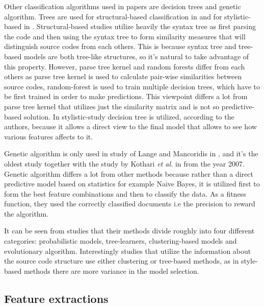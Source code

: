 \documentclass[english]{tktltiki2}
\theoremstyle{definition}
\theoremstyle{remark}
\begin{document}
Other classification algorithms used in papers are decision trees and genetic algorithm. Trees are used for structural-based classification in \cite{Son:2013:APS:2508269.2508323, caliskan2015anonymizing} and for stylistic-based in \cite{Elenbogen:2008:DOS:1295109.1295123}. Structural-based studies utilize heavily the syntax tree as first parsing the code and then using the syntax tree to form similarity measures that will distinguish source codes from each others. This is because syntax tree and tree-based models are both tree-like structures, so it's natural to take advantage of this property. However, parse tree kernel and random forests differ from each others as parse tree kernel is used to calculate pair-wise similarities between source codes, random-forest is used to train multiple decision trees, which have to be first trained in order to make predictions. This viewpoint differs a lot from parse tree kernel that utilizes just the similarity matrix and is not so predictive-based solution. In stylistic-study decision tree is utilized, according to the authors, because it allows a direct view to the final model that allows to see how various features affects to it. 

Genetic algorithm is only used in study of Lange and Mancoridis in \cite{lange2007using}, and it's the oldest study together with the study by Kothari \textit{et al.} in \cite{kothari2007probabilistic} from the year 2007. Genetic algorithm differs a lot from other methods because rather than a direct predictive model based on statistics for example Naive Bayes, it is utilized first to form the best feature combinations and then to classify the data. As a fitness function, they used the correctly classified documents i.e the precision to reward the algorithm.

It can be seen from studies that their methods divide roughly into four different categories: probabilistic models, tree-learners, clustering-based models and evolutionary algorithm. Interestingly studies that utilize the information about the source code structure use either clustering or tree-based methods, as in style-based methods there are more variance in the model selection. %


\subsection{Feature extractions}
\end{document}

